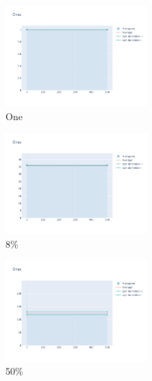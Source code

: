 \documentclass[12pt, fleqn]{report}                             %
\theoremstyle{break}                                            %
\begin{document}
      \begin{figure}[ht!]
        \centering
        \begin{subfigure}[b]{0.4\linewidth}
          \includegraphics[width=0.6\textwidth]{Images/140/dia-a.png}
          \caption{One}
        \end{subfigure}
        \begin{subfigure}[b]{0.4\linewidth}
          \includegraphics[width=0.6\textwidth]{Images/140/dia-b.png}
          \caption{8\%}
        \end{subfigure}
        \begin{subfigure}[b]{0.4\linewidth}
          \includegraphics[width=0.6\textwidth]{Images/140/dia-c.png}
          \caption{50\%}
        \end{subfigure}
        \begin{subfigure}[b]{0.4\linewidth}

\end{subfigure}
\end{figure}
\end{document}
